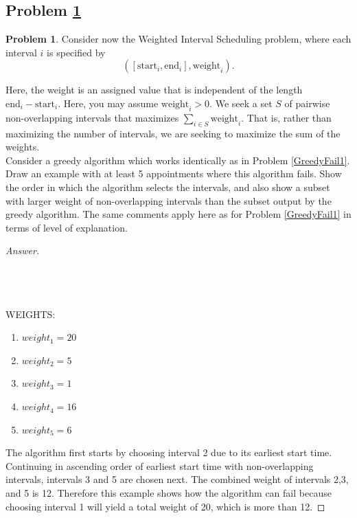 \documentclass[11pt]{article}
\theoremstyle{definition}
\theoremstyle{definition}
\newtheorem{required}{Problem}
\theoremstyle{definition}
\newcommand{\interval}[4]{\draw (#2, #1) -- (#3, #1); %
\draw (#2, #1-0.11) -- (#2, #1+0.11); %
\draw (#3, #1-0.11) -- (#3, #1+0.11); %
\node[] at (#2-0.25, #1) {#4};
}
\begin{document}
\newpage
\subsection{Problem \ref{GreedyFail3}}
\begin{required} \label{GreedyFail3}
Consider now the \textsf{Weighted Interval Scheduling} problem, where each interval $i$ is specified by 
\[
([\text{start}_{i}, \text{end}_{i}], \text{weight}_{i}). 
\]

\noindent Here, the weight is an assigned value that is independent of the length $\text{end}_{i} - \text{start}_{i}$. Here, you may assume $\text{weight}_{i} > 0$. We seek a set $S$ of pairwise non-overlapping intervals that maximizes $\sum_{i \in S} \text{weight}_{i}$. That is, rather than maximizing the number of intervals, we are seeking to maximize the sum of the weights. \\

\noindent Consider a greedy algorithm which works identically as in Problem \ref{GreedyFail1}. Draw an example with at least 5 appointments where this algorithm fails. Show the order in which the algorithm selects the intervals, and also show a subset with larger weight of non-overlapping intervals than the subset output by the greedy algorithm. The same comments apply here as for Problem \ref{GreedyFail1} in terms of level of explanation.
\end{required}

\begin{proof}[Answer] $ $ \\ \\
\\ \\
WEIGHTS: 
\begin{enumerate}
    \item $weight_1 = 20$
    \item $weight_2 = 5$
    \item $weight_3 = 1$
    \item $weight_4 = 16$
    \item $weight_5 = 6$
\end{enumerate}

The algorithm first starts by choosing interval 2 due to its earliest start time. Continuing in ascending order of earliest start time with non-overlapping intervals, intervals 3 and 5 are chosen next. The combined weight of intervals 2,3, and 5 is 12. Therefore this example shows how the algorithm can fail because choosing interval 1 will yield a total weight of 20, which is more than 12. 
\end{proof}
\end{document}
